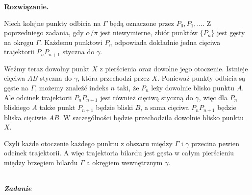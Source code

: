 \documentclass[11pt,a4paper]{article}
\newcounter{zadanie}\newcommand{\zadanie}[1][]{\addtocounter{zadanie}{1} ~\\  {\bf \emph{Zadanie \arabic{zadanie} #1 }} \\}
\newenvironment{solution}{\vspace{1cm} \par\textbf{Rozwiązanie.} \vspace{1cm}}{}
\begin{document}
\begin{solution}


Niech kolejne punkty odbicia na $\Gamma$ będą oznaczone przez $P_0,P_1,\ldots$. Z poprzedniego zadania,
gdy $\alpha/\pi$ jest niewymierne, zbiór punktów $\{P_n\}$ jest gęsty na okręgu
$\Gamma$. Każdemu punktowi $P_n$ odpowiada dokładnie jedna cięciwa trajektorii
$P_nP_{n+1}$ styczna do $\gamma$.

Weźmy teraz dowolny punkt $X$ z pierścienia oraz dowolne jego otoczenie. Istnieje 
cięciwa $AB$ styczna do $\gamma$, która przechodzi przez $X$.
Ponieważ punkty odbicia są gęste na $\Gamma$, możemy znaleźć indeks $n$ taki, że
$P_n$ leży dowolnie blisko punktu $A$. Ale odcinek trajektorii $P_nP_{n+1}$ jest
również cięciwą styczną do $\gamma$, więc dla $P_n$ bliskiego $A$ także punkt $P_{n+1}$
będzie bliski $B$, a sama cięciwa $P_nP_{n+1}$ będzie bliska cięciwie $AB$.
W szczególności będzie przechodziła dowolnie blisko punktu $X$.

\begin{center}
\end{center}

Czyli każde otoczenie każdego punktu z obszaru między $\Gamma$ i $\gamma$
przecina pewien odcinek trajektorii. A więc trajektoria bilardu jest gęsta w całym
pierścieniu między brzegiem bilardu $\Gamma$ a okręgiem wewnętrznym $\gamma$.

\newpage   
\end{solution}
\zadanie[]
\end{document}
